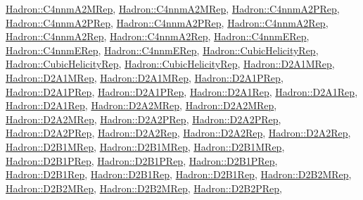 \mbox{\hyperlink{structHadron_1_1C4nnmA2MRep}{Hadron\+::\+C4nnm\+A2\+M\+Rep}}, \mbox{\hyperlink{structHadron_1_1C4nnmA2MRep}{Hadron\+::\+C4nnm\+A2\+M\+Rep}}, \mbox{\hyperlink{structHadron_1_1C4nnmA2PRep}{Hadron\+::\+C4nnm\+A2\+P\+Rep}}, \mbox{\hyperlink{structHadron_1_1C4nnmA2PRep}{Hadron\+::\+C4nnm\+A2\+P\+Rep}}, \mbox{\hyperlink{structHadron_1_1C4nnmA2PRep}{Hadron\+::\+C4nnm\+A2\+P\+Rep}}, \mbox{\hyperlink{structHadron_1_1C4nnmA2Rep}{Hadron\+::\+C4nnm\+A2\+Rep}}, \mbox{\hyperlink{structHadron_1_1C4nnmA2Rep}{Hadron\+::\+C4nnm\+A2\+Rep}}, \mbox{\hyperlink{structHadron_1_1C4nnmA2Rep}{Hadron\+::\+C4nnm\+A2\+Rep}}, \mbox{\hyperlink{structHadron_1_1C4nnmERep}{Hadron\+::\+C4nnm\+E\+Rep}}, \mbox{\hyperlink{structHadron_1_1C4nnmERep}{Hadron\+::\+C4nnm\+E\+Rep}}, \mbox{\hyperlink{structHadron_1_1C4nnmERep}{Hadron\+::\+C4nnm\+E\+Rep}}, \mbox{\hyperlink{structHadron_1_1CubicHelicityRep}{Hadron\+::\+Cubic\+Helicity\+Rep}}, \mbox{\hyperlink{structHadron_1_1CubicHelicityRep}{Hadron\+::\+Cubic\+Helicity\+Rep}}, \mbox{\hyperlink{structHadron_1_1CubicHelicityRep}{Hadron\+::\+Cubic\+Helicity\+Rep}}, \mbox{\hyperlink{structHadron_1_1D2A1MRep}{Hadron\+::\+D2\+A1\+M\+Rep}}, \mbox{\hyperlink{structHadron_1_1D2A1MRep}{Hadron\+::\+D2\+A1\+M\+Rep}}, \mbox{\hyperlink{structHadron_1_1D2A1MRep}{Hadron\+::\+D2\+A1\+M\+Rep}}, \mbox{\hyperlink{structHadron_1_1D2A1PRep}{Hadron\+::\+D2\+A1\+P\+Rep}}, \mbox{\hyperlink{structHadron_1_1D2A1PRep}{Hadron\+::\+D2\+A1\+P\+Rep}}, \mbox{\hyperlink{structHadron_1_1D2A1PRep}{Hadron\+::\+D2\+A1\+P\+Rep}}, \mbox{\hyperlink{structHadron_1_1D2A1Rep}{Hadron\+::\+D2\+A1\+Rep}}, \mbox{\hyperlink{structHadron_1_1D2A1Rep}{Hadron\+::\+D2\+A1\+Rep}}, \mbox{\hyperlink{structHadron_1_1D2A1Rep}{Hadron\+::\+D2\+A1\+Rep}}, \mbox{\hyperlink{structHadron_1_1D2A2MRep}{Hadron\+::\+D2\+A2\+M\+Rep}}, \mbox{\hyperlink{structHadron_1_1D2A2MRep}{Hadron\+::\+D2\+A2\+M\+Rep}}, \mbox{\hyperlink{structHadron_1_1D2A2MRep}{Hadron\+::\+D2\+A2\+M\+Rep}}, \mbox{\hyperlink{structHadron_1_1D2A2PRep}{Hadron\+::\+D2\+A2\+P\+Rep}}, \mbox{\hyperlink{structHadron_1_1D2A2PRep}{Hadron\+::\+D2\+A2\+P\+Rep}}, \mbox{\hyperlink{structHadron_1_1D2A2PRep}{Hadron\+::\+D2\+A2\+P\+Rep}}, \mbox{\hyperlink{structHadron_1_1D2A2Rep}{Hadron\+::\+D2\+A2\+Rep}}, \mbox{\hyperlink{structHadron_1_1D2A2Rep}{Hadron\+::\+D2\+A2\+Rep}}, \mbox{\hyperlink{structHadron_1_1D2A2Rep}{Hadron\+::\+D2\+A2\+Rep}}, \mbox{\hyperlink{structHadron_1_1D2B1MRep}{Hadron\+::\+D2\+B1\+M\+Rep}}, \mbox{\hyperlink{structHadron_1_1D2B1MRep}{Hadron\+::\+D2\+B1\+M\+Rep}}, \mbox{\hyperlink{structHadron_1_1D2B1MRep}{Hadron\+::\+D2\+B1\+M\+Rep}}, \mbox{\hyperlink{structHadron_1_1D2B1PRep}{Hadron\+::\+D2\+B1\+P\+Rep}}, \mbox{\hyperlink{structHadron_1_1D2B1PRep}{Hadron\+::\+D2\+B1\+P\+Rep}}, \mbox{\hyperlink{structHadron_1_1D2B1PRep}{Hadron\+::\+D2\+B1\+P\+Rep}}, \mbox{\hyperlink{structHadron_1_1D2B1Rep}{Hadron\+::\+D2\+B1\+Rep}}, \mbox{\hyperlink{structHadron_1_1D2B1Rep}{Hadron\+::\+D2\+B1\+Rep}}, \mbox{\hyperlink{structHadron_1_1D2B1Rep}{Hadron\+::\+D2\+B1\+Rep}}, \mbox{\hyperlink{structHadron_1_1D2B2MRep}{Hadron\+::\+D2\+B2\+M\+Rep}}, \mbox{\hyperlink{structHadron_1_1D2B2MRep}{Hadron\+::\+D2\+B2\+M\+Rep}}, \mbox{\hyperlink{structHadron_1_1D2B2MRep}{Hadron\+::\+D2\+B2\+M\+Rep}}, \mbox{\hyperlink{structHadron_1_1D2B2PRep}{Hadron\+::\+D2\+B2\+P\+Rep}}, 
